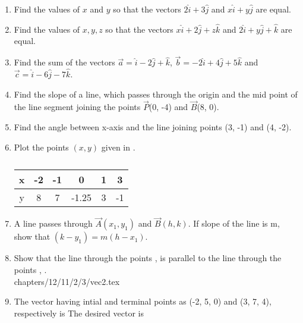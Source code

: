 \begin{enumerate}[label=\thesubsection.\arabic*, ref=\thesubsection.\theenumi]
	\item 		Find the values of $x$ and $y$ so that the vectors
$2\hat{i}+3\hat{j}$
and 
$x\hat{i}+y\hat{j}$
are equal.
\\
\solution

\item Find the values of $x, y, z$ so that the vectors 
$x\hat{i}+2\hat{j}+z\hat{k}$
and 
$2\hat{i}+y\hat{j}+\hat{k}$
are equal.
\item Find the sum of the vectors $\vec{a}=\hat{i}-2\hat{j}+\hat{k}$,  $\vec{b}=-2\hat{i}+4\hat{j}+5\hat{k}$ and $\vec{c}=\hat{i}-6\hat{j}-7\hat{k}$.
\item Find the slope of a line,  which passes through the origin and the mid point of the line segment joining the points $\vec{P}$(0, -4) and $\vec{B}$(8, 0).
\label{chapters/11/10/1/5}
	\\
	\solution

\item Find the angle between x-axis and the line joining points (3, -1) and (4, -2).
\label{chapters/11/10/1/10}
\\
\solution 

\item Plot the points $(x, y)$ given in 
.
\begin{table}[H]
	\centering
\begin{tabular}{|c|c|c|c|c|c|}
\hline	
x & -2 & -1 & 0 & 1 & 3\\
\hline
y & 8 & 7 & -1.25 & 3 & -1\\
\hline
\end{tabular}
\caption{}
\label{table:Table of values}
\end{table}
\item A line passes through $\vec{A}(x_1, y_1)$ and $\vec{B}(h, k)$. If slope of the line is m,  show that $(k-y_1)=m(h-x_1)$.
\label{chapters/11/10/1/12}
\\
\solution 

\item
Show that the line through the points ,  is parallel to the line through the points , .
	\label{12.11.2.3}
\\
\solution
	 {chapters/12/11/2/3/vec2.tex}
\item The vector having intial and terminal points as (-2, 5, 0) and (3, 7, 4), respectively is
\solution
The desired vector is

\end{enumerate}
